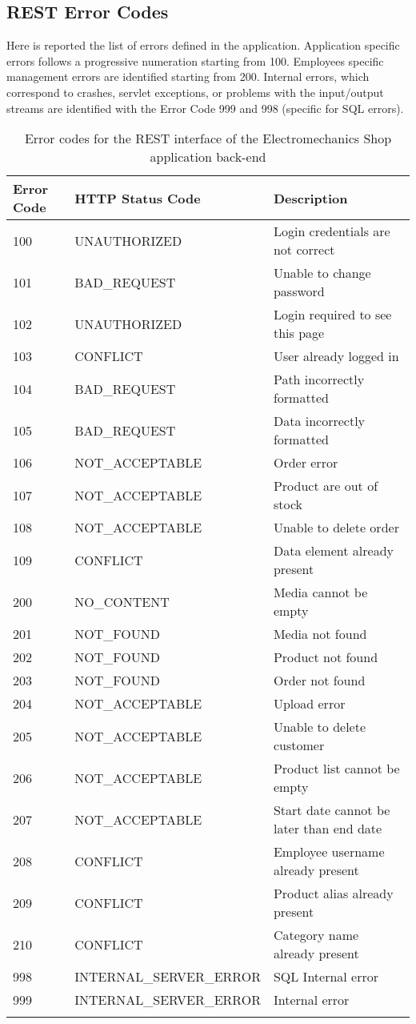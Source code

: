 \subsection{REST Error Codes}

Here is reported the list of errors defined in the application. Application specific errors follows a progressive numeration starting from 100. Employees specific management errors are identified starting from 200. Internal errors, which correspond to crashes, servlet exceptions, or problems with the input/output streams are identified with the Error Code 999 and 998 (specific for SQL errors).

\begin{longtable}{|p{}|p{}|p{}|}
\hline
\textbf{Error Code} & \textbf{HTTP Status Code} & \textbf{Description} \\\hline

100 & UNAUTHORIZED & Login credentials are not correct \\\hline
101 & BAD\_REQUEST & Unable to change password \\\hline
102 & UNAUTHORIZED & Login required to see this page \\\hline
103 & CONFLICT & User already logged in \\\hline
104 & BAD\_REQUEST & Path incorrectly formatted \\\hline
105 & BAD\_REQUEST & Data incorrectly formatted \\\hline
106 & NOT\_ACCEPTABLE & Order error \\\hline
107 & NOT\_ACCEPTABLE & Product are out of stock \\\hline
108 & NOT\_ACCEPTABLE & Unable to delete order \\\hline
109 & CONFLICT & Data element already present \\\hline

200 & NO\_CONTENT & Media cannot be empty \\\hline
201 & NOT\_FOUND & Media not found \\\hline
202 & NOT\_FOUND & Product not found \\\hline
203 & NOT\_FOUND & Order not found \\\hline
204 & NOT\_ACCEPTABLE & Upload error \\\hline
205 & NOT\_ACCEPTABLE & Unable to delete customer \\\hline
206 & NOT\_ACCEPTABLE & Product list cannot be empty \\\hline
207 & NOT\_ACCEPTABLE & Start date cannot be later than end date \\\hline
208 & CONFLICT & Employee username already present \\\hline
209 & CONFLICT & Product alias already present \\\hline
210 & CONFLICT & Category name already present \\\hline

998 & INTERNAL\_SERVER\_ERROR & SQL Internal error \\\hline
999 & INTERNAL\_SERVER\_ERROR & Internal error \\\hline

\caption{Error codes for the REST interface of the Electromechanics Shop application back-end}
\label{tab:ErrorRest}
\end{longtable}